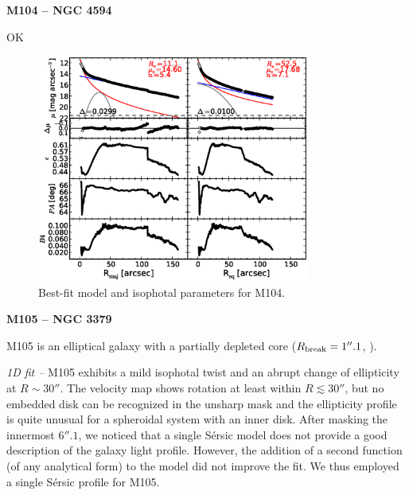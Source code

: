 \documentclass[preprint2]{emulateapj}
\newcommand{\fitfigurewidth}{0.8\textwidth}
\begin{document}
  {\bf M104 -- NGC 4594 \\} 

  OK

  \begin{figure}[h]
  \begin{center}
  \includegraphics[width=\fitfigurewidth]{images/m104_1Dfit.eps}
  \caption{Best-fit model and isophotal parameters for M104.}
  \end{center}
  \end{figure}

  \clearpage\newpage\noindent
  {\bf M105 -- NGC 3379 \\}

  M105 is an elliptical galaxy with a partially depleted core ($R_{\rm break} = 1''.1$, \citealt{rusli2013}).

  \emph{1D fit -- }
  M105 exhibits a mild isophotal twist and an abrupt change of ellipticity at $R \sim 30''$.
  The velocity map shows rotation at least within $R \lesssim 30''$, 
  but no embedded disk can be recognized in the unsharp mask 
  and the ellipticity profile is quite unusual for a spheroidal system with an inner disk.
  After masking the innermost $6''.1$, we noticed that a single S\'ersic model 
  does not provide a good description of the galaxy light profile.
  However, the addition of a second function (of any analytical form) to the model did not improve the fit.
  We thus employed a single S\'ersic profile for M105.
\end{document}
